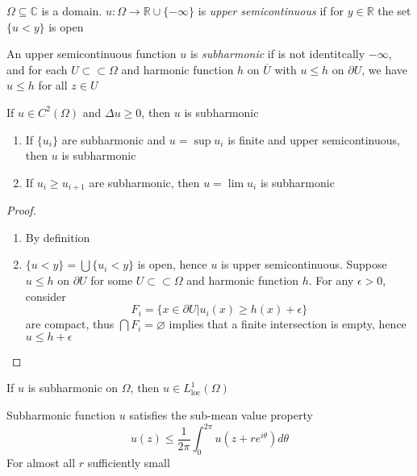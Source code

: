 \documentclass[../main.tex]{subfiles}
\begin{document}
\begin{definition}
$\Omega\subseteq\mathbb C$ is a domain. $u:\Omega\to\mathbb R\cup\{-\infty\}$ is \textit{upper semicontinuous} if for $y\in\mathbb R$ the set $\{u<y\}$ is open
\end{definition}

\begin{definition}
An upper semicontinuous function $u$ is \textit{subharmonic} if is not identitcally $-\infty$, and for each $U\subset\subset\Omega$ and harmonic function $h$ on $\overline U$ with $u\leq h$ on $\partial U$, we have $u\leq h$ for all $z\in U$
\end{definition}

\begin{example}
If $u\in C^2(\Omega)$ and $\Delta u\geq0$, then $u$ is subharmonic
\end{example}

\begin{theorem}
\begin{enumerate}
\item If $\{u_i\}$ are subharmonic and $u=\sup u_i$ is finite and upper semicontinuous, then $u$ is subharmonic
\item If $u_i\geq u_{i+1}$ are subharmonic, then $u=\lim u_i$ is subharmonic
\end{enumerate}
\end{theorem}

\begin{proof}
\begin{enumerate}
\item By definition
\item $\{u<y\}=\bigcup\{u_i<y\}$ is open, hence $u$ is upper semicontinuous. Suppose $u\leq h$ on $\partial U$ for some $U\subset\subset\Omega$ and harmonic function $h$. For any $\epsilon>0$, consider \[F_i=\{x\in\partial U|u_i(x)\geq h(x)+\epsilon\}\] are compact, thus $\bigcap F_i=\varnothing$ implies that a finite intersection is empty, hence $u\leq h+\epsilon$
\end{enumerate}
\end{proof}

\begin{fact}
If $u$ is subharmonic on $\Omega$, then $u\in L^1_\mathrm{loc}(\Omega)$
\end{fact}

\begin{theorem}
Subharmonic function $u$ satisfies the sub-mean value property
\begin{equation}\label{Sub-mean value property}
u(z)\leq\frac{1}{2\pi}\int_0^{2\pi}u(z+re^{i\theta})d\theta
\end{equation}
For almost all $r$ sufficiently small
\end{theorem}
\end{document}
